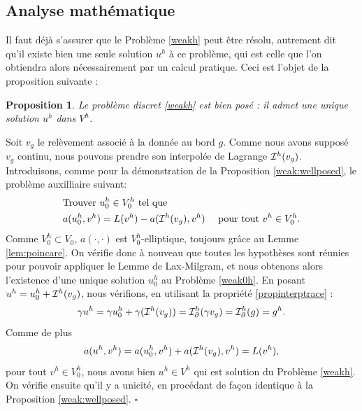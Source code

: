 \documentclass[11pt]{book}
\newtheorem{proposition}[theorem]{Proposition}
\newcommand{\beqs}{\begin{eqnarray*}}
\newcommand{\eeqs}{\end{eqnarray*}}
\newcommand{\bp}{\begin{proposition}}
\newcommand{\ep}{\end{proposition}}
\newcommand{\cqfd}{{$\mbox{}$\hfill$\square$}}
\def\a{{\bf a}}
\newcommand{\caI}{{\cal I}}
\newcommand{\caC}{{\cal C}}
\begin{document}
\subsection{Analyse mathématique}

% 

Il faut déjà s'assurer que le Problème \eqref{weakh} peut être résolu, autrement dit qu'il existe bien une seule solution $u^h$ à ce problème, qui est celle que l'on obtiendra alors nécessairement par un calcul pratique.
Ceci est l'objet de la proposition suivante : 

\bp
Le problème discret \eqref{weakh} est bien posé : il admet une unique solution $u^h$ dans $V^h$.
\ep

\proof Soit $v_g$ le relèvement associé à la donnée au bord $g$. Comme nous avons supposé $v_g$ continu, nous pouvons prendre son interpolée de Lagrange $\caI^h ( v_g)$.
Introduisons, comme pour la démonstration de la Proposition \ref{weak:wellposed}, le problème auxilliaire suivant:
\begin{align} 
\label{weak0h}
&\mbox{Trouver } u^h_0\in V^h_0 \mbox{ tel que }\nonumber\\
&
a(u^h_0,v^h) = L(v^h) - a ( \caI^h (v_g) , v^h) \quad \textrm{ pour tout } v^h \in V^h_0.
\end{align}
Comme $V^h_0 \subset V_0$, $a(\cdot,\cdot)$ est $V^h_0$-elliptique, toujours grâce %
au Lemme \ref{lem:poincare}. On vérifie donc à nouveau que toutes les hypothèses sont réunies pour pouvoir appliquer le Lemme de Lax-Milgram, et nous obtenons alors l'existence d'une unique solution $u^h_0$ au Problème \eqref{weak0h}.
En posant $u^h = u^h_0 + \caI^h (v_g)$, nous vérifions, en utilisant la propriété \eqref{propinterptrace} :
\[
\gamma u^h = \gamma u^h_0 + \gamma ( \caI^h (v_g) ) = \caI^h_\partial ( \gamma v_g ) 
= \caI^h_\partial ( g ) = g^h.
\]
Comme de plus
\[
a (u^h  , v^h ) = a ( u^h_0 , v^h ) + a ( \caI^h (v_g) , v^h ) = L (v^h),
\]
pour tout $v^h \in V^h_0$, nous avons bien
$u^h \in V^h$ qui est solution du Problème \eqref{weakh}. On vérifie ensuite qu'il y a unicité, en procédant de façon identique à la Proposition \ref{weak:wellposed}. \cqfd
\end{document}

